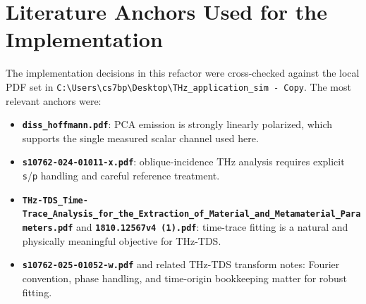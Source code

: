 \documentclass[11pt]{article}
\begin{document}
\section{Literature Anchors Used for the Implementation}
The implementation decisions in this refactor were cross-checked against the local PDF set in
\texttt{C:\textbackslash Users\textbackslash cs7bp\textbackslash Desktop\textbackslash THz\_application\_sim - Copy}.
The most relevant anchors were:
\begin{itemize}[leftmargin=2em]
\item \textbf{\texttt{diss\_hoffmann.pdf}}: PCA emission is strongly linearly polarized, which
supports the single measured scalar channel used here.
\item \textbf{\texttt{s10762-024-01011-x.pdf}}: oblique-incidence THz analysis requires explicit
\texttt{s}/\texttt{p} handling and careful reference treatment.
\item \textbf{\texttt{THz-TDS\_Time-Trace\_Analysis\_for\_the\_Extraction\_of\_Material\_and\_Metamaterial\_Parameters.pdf}}
and \textbf{\texttt{1810.12567v4 (1).pdf}}: time-trace fitting is a natural and physically
meaningful objective for THz-TDS.
\item \textbf{\texttt{s10762-025-01052-w.pdf}} and related THz-TDS transform notes: Fourier
convention, phase handling, and time-origin bookkeeping matter for robust fitting.
\end{itemize}
\end{document}
